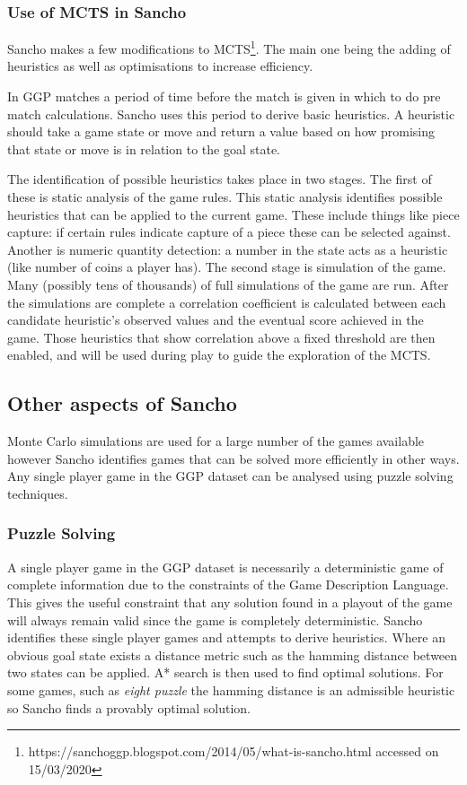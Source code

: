 \subsubsection{Use of MCTS in Sancho}

Sancho makes a few modifications to MCTS\footnote{https://sanchoggp.blogspot.com/2014/05/what-is-sancho.html accessed on 15/03/2020}. The main one being the adding of heuristics as well as optimisations to increase efficiency.

In GGP matches a period of time before the match is given in which to do pre match calculations. Sancho uses this period to derive basic heuristics. A heuristic should take a game state or move and return a value based on how promising that state or move is in relation to the goal state. 

The identification of possible heuristics takes place in two stages. The first of these is static analysis of the game rules. This static analysis identifies possible heuristics that can be applied to the current game. These include things like piece capture: if certain rules indicate capture of a piece these can be selected against. Another is numeric quantity detection: a number in the state acts as a heuristic (like number of coins a player has). The second stage is simulation of the game. Many (possibly tens of thousands) of full simulations of the game are run. After the simulations are complete a correlation coefficient is calculated between each candidate heuristic's observed values and the eventual score achieved in the game. Those heuristics that show correlation above a fixed threshold are then enabled, and will be used during play to guide the exploration of the MCTS.

\subsection{Other aspects of Sancho}

Monte Carlo simulations are used for a large number of the games available however Sancho identifies games that can be solved more efficiently in other ways. Any single player game in the GGP dataset can be analysed using puzzle solving techniques.
\subsubsection{Puzzle Solving}
A single player game in the GGP dataset is necessarily a deterministic game of complete information due to the constraints of the Game Description Language. This gives the useful constraint that any solution found in a playout of the game will always remain valid since the game is completely deterministic. Sancho identifies these single player games and attempts to derive heuristics. Where an obvious goal state exists a distance metric such as the hamming distance between two states can be applied. A* search is then used to find optimal solutions. For some games, such as \textit{eight puzzle} the hamming distance is an admissible heuristic so Sancho finds a provably optimal solution.

